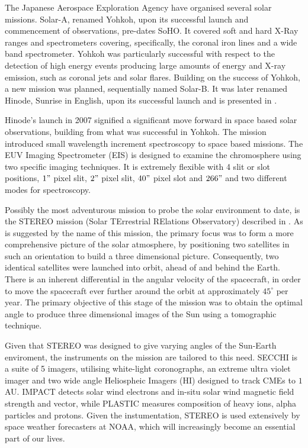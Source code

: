 The Japanese Aerospace Exploration Agency have organised several solar missions.
Solar-A, renamed Yohkoh, \cite{Tsuneta1991} upon its successful launch and commencement of observations, pre-dates SoHO.
It covered soft and hard X-Ray ranges and spectrometers covering, specifically, the coronal iron lines and a wide band spectrometer. 
Yohkoh was particularly successful with respect to the detection of high energy events producing large amounts of energy and X-ray emission, such as coronal jets and solar flares.
Building on the success of Yohkoh, a new mission was planned, sequentially named Solar-B.
It was later renamed Hinode, Sunrise in English, upon its successful launch and is presented in \cite{Kosugi2007}.
 
Hinode's launch in 2007 signified a significant move forward in space based solar observations, building from what was successful in Yohkoh.
The mission introduced small wavelength increment spectroscopy to space based missions.
The EUV Imaging Spectrometer (EIS) is designed to examine the chromosphere using two specific imaging techniques.
It is extremely flexible with 4 slit or slot positions, $1"$ pixel slit, $2"$ pixel slit, $40"$ pixel slot and $266"$ and two different modes for spectroscopy.

Possibly the most adventurous mission to probe the solar environment to date, is the STEREO mission (Solar TErrestrial RElations Observatory) described in \cite{Kaiser2008}.
As is suggested by the name of this mission, the primary focus was to form a more comprehensive picture of the solar atmosphere, by positioning two satellites in such an orientation to build a three dimensional picture.
Consequently, two identical satellites were launched into orbit, ahead of and behind the Earth.
There is an inherent differential in the angular velocity of the spacecraft, in order to move the spacecraft ever further around the orbit at approximately $45^\circ$ per year.
The primary objective of this stage of the mission was to obtain the optimal angle to produce three dimensional images of the Sun using a tomographic technique.

Given that STEREO was designed to give varying angles of the Sun-Earth  enviroment, the instruments on the mission are tailored to this need.
SECCHI is a suite of 5 imagers, utilising white-light coronographs, an extreme ultra violet imager and two wide angle Heliospheic Imagers (HI) designed to track CMEs to $1$ AU.
IMPACT detects solar wind electrons and in-situ solar wind magnetic field strength and vector, while PLASTIC measures composition of heavy ions, alpha particles and protons. 
Given the instumentation, STEREO is used extensively by space weather forecasters at NOAA, which will increasingly become an essential part of our lives.

